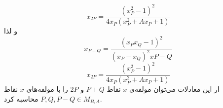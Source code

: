 $$ x_{2P} = \frac{(x_P^2-1)^2}{4x_P(x_P^2+Ax_P+1)} $$
و لذا
$$ x_{P+Q}  = \frac{(x_Px_Q-1)^2}{(x_P-x_Q)^2x{P-Q}}$$
$$ x_{2P} = \frac{(x_P^2-1)^2}{4x_P(x_P^2+Ax_P+1)} $$
ار این معادلات می‌توان مولفه‌ی
$x$
نقاط
$P+Q$
و
$2P$
را با مولفه‌های
$x$
نقاط
$P,Q,P-Q \in M_{B,A}$
محاسبه کرد.
































